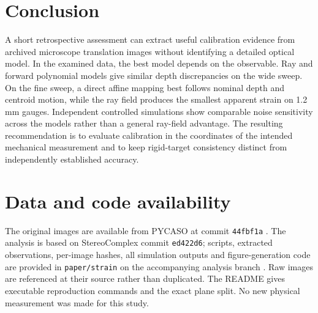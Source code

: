 \documentclass[10pt,a4paper]{article}
\begin{document}
\section{Conclusion}
A short retrospective assessment can extract useful calibration evidence from archived microscope translation images without identifying a detailed optical model. In the examined data, the best model depends on the observable. Ray and forward polynomial models give similar depth discrepancies on the wide sweep. On the fine sweep, a direct affine mapping best follows nominal depth and centroid motion, while the ray field produces the smallest apparent strain on 1.2\,mm gauges. Independent controlled simulations show comparable noise sensitivity across the models rather than a general ray-field advantage. The resulting recommendation is to evaluate calibration in the coordinates of the intended mechanical measurement and to keep rigid-target consistency distinct from independently established accuracy.

\section*{Data and code availability}
The original images are available from PYCASO at commit \texttt{44fbf1a} \cite{pycasodata}. The analysis is based on StereoComplex commit \texttt{ed422d6}; scripts, extracted observations, per-image hashes, all simulation outputs and figure-generation code are provided in \texttt{paper/strain} on the accompanying analysis branch \cite{analysiscode}. Raw images are referenced at their source rather than duplicated. The README gives executable reproduction commands and the exact plane split. No new physical measurement was made for this study.



\end{document}
